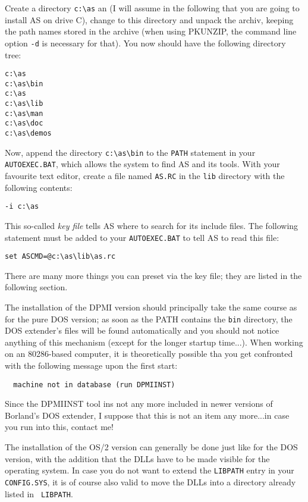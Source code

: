 \documentclass[12pt,twoside]{report}
\newcommand{\tty}[1]{{\tt #1}}
\begin{document}
Create a directory \verb!c:\as! an (I will assume in the following that
you are going to install AS on drive C), change to this directory and
unpack the archiv, keeping the path names stored in the archive (when
using PKUNZIP, the command line option \verb!-d! is necessary for that).
You now should have the following directory tree:
\begin{verbatim}
c:\as
c:\as\bin
c:\as
c:\as\lib
c:\as\man
c:\as\doc
c:\as\demos
\end{verbatim}
Now, append the directory \verb!c:\as\bin! to the \tty{PATH} statement in
your \tty{AUTOEXEC.BAT}, which allows the system to find AS and its tools.
With your favourite text editor, create a file named \tty{AS.RC} in the
\tty{lib} directory with the following contents:
\begin{verbatim}
-i c:\as
\end{verbatim}  
This so-called {\em key file} tells AS where to search for its include
files.  The following statement must be added to your \tty{AUTOEXEC.BAT}
to tell AS to read this file:
\begin{verbatim}
set ASCMD=@c:\as\lib\as.rc
\end{verbatim}
There are many more things you can preset via the key file; they are
listed in the following section.

The installation of the DPMI version  should
principally take the same course as for the pure DOS version; as soon as
the PATH contains the {\tt bin} directory, the DOS extender's files will
be found automatically and you should not notice anything of this
mechanism (except for the longer startup time...).  When working on an
80286-based computer, it is theoretically possible tha you get confronted
with the following message upon the first start:
\begin{verbatim}
  machine not in database (run DPMIINST)
\end{verbatim}
Since the DPMIINST tool ins not any more included in newer versions of
Borland's DOS extender, I suppose that this is not an item any more...in
case you run into this, contact me!

The installation of the OS/2 version  can generally
be done just like for the DOS version, with the addition that the DLLs
have to be made visible for the operating system. In case you do not want
to extend the {\tt LIBPATH} entry in your {\tt CONFIG.SYS}, it is of
course also valid to move the DLLs into a directory already listed in {\tt
LIBPATH}.
\end{document}
